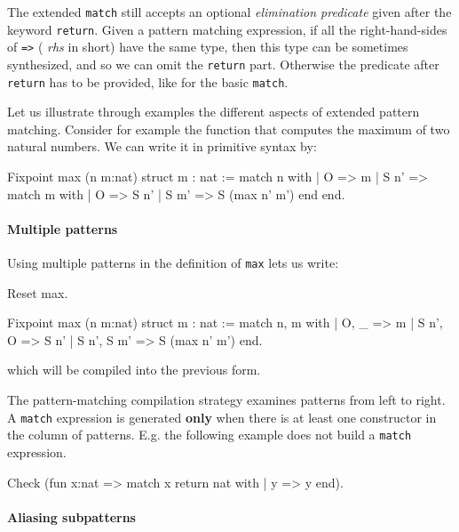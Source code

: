 The extended \texttt{match} still accepts an optional {\em elimination
predicate} given after the keyword \texttt{return}.  Given a pattern
matching expression, if all the right-hand-sides of \texttt{=>} ({\em
rhs} in short) have the same type, then this type can be sometimes
synthesized, and so we can omit the \texttt{return} part. Otherwise
the predicate after \texttt{return} has to be provided, like for the basic
\texttt{match}.

Let us illustrate through examples the different aspects of extended
pattern matching. Consider for example the function that computes the
maximum of two natural numbers. We can write it in primitive syntax
by:

\begin{coq_example}
Fixpoint max (n m:nat) {struct m} : nat :=
  match n with
  | O => m
  | S n' => match m with
            | O => S n'
            | S m' => S (max n' m')
            end
  end.
\end{coq_example}

\paragraph{Multiple patterns}

Using multiple patterns in the definition of {\tt max} lets us write:

\begin{coq_eval}
Reset max.
\end{coq_eval}
\begin{coq_example}
Fixpoint max (n m:nat) {struct m} : nat :=
  match n, m with
  | O, _ => m
  | S n', O => S n'
  | S n', S m' => S (max n' m')
  end.
\end{coq_example}

which will be compiled into the previous form.

The pattern-matching compilation strategy examines patterns from left
to right. A \texttt{match} expression is generated {\bf only} when
there is at least one constructor in the column of patterns. E.g. the
following example does not build a \texttt{match} expression.

\begin{coq_example}
Check (fun x:nat => match x return nat with
                    | y => y
                    end).
\end{coq_example}

\paragraph{Aliasing subpatterns}

